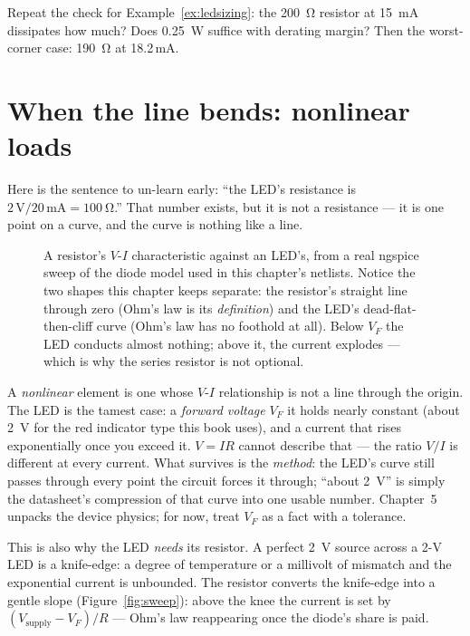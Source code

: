 \begin{exercise}[medium]
Repeat the check for Example~\ref{ex:ledsizing}: the \qty{200}{\ohm} resistor
at \qty{15}{\milli\ampere} dissipates how much? Does \qty{0.25}{\watt} suffice
with derating margin? Then the worst-corner case: \qty{190}{\ohm} at
18.2\,mA.
\end{exercise}

\section{When the line bends: nonlinear loads}
\label{sec:nonlinear}

Here is the sentence to un-learn early: ``the LED's resistance is
$2\,\mathrm{V}/20\,\mathrm{mA} = \qty{100}{\ohm}$.'' That number exists, but
it is not a resistance — it is one point on a curve, and the curve is nothing
like a line.

\begin{figure}[htbp]
\centering

\caption{A resistor's $V$-$I$ characteristic against an LED's, from a real
ngspice sweep of the diode model used in this chapter's netlists. Notice the
two shapes this chapter keeps separate: the resistor's straight line through
zero (Ohm's law is its \emph{definition}) and the LED's dead-flat-then-cliff
curve (Ohm's law has no foothold at all). Below $V_F$ the LED conducts almost
nothing; above it, the current explodes — which is why the series resistor is
not optional.}
\label{fig:vi}
\end{figure}

A \emph{nonlinear} element is one whose $V$-$I$
relationship is not a line through the origin. The LED is the tamest case:
a \emph{forward voltage} $V_F$ it holds nearly
constant (about \qty{2}{\volt} for the red indicator type this book uses),
and a current that rises exponentially once you exceed it. $V=IR$ cannot
describe that — the ratio $V/I$ is different at every current. What survives
is the \emph{method}: the LED's curve still passes through every point the
circuit forces it through; ``about \qty{2}{\volt}'' is simply the datasheet's
compression of that curve into one usable number. Chapter~5 unpacks the
device physics; for now, treat $V_F$ as a fact with a tolerance.

\begin{remark}
This is also why the LED \emph{needs} its resistor. A perfect \qty{2}{\volt}
source across a 2-V LED is a knife-edge: a degree of temperature or a
millivolt of mismatch and the exponential current is unbounded. The resistor
converts the knife-edge into a gentle slope (Figure~\ref{fig:sweep}): above
the knee the current is set by $(V_{\mathrm{supply}}-V_F)/R$ — Ohm's law
reappearing once the diode's share is paid.
\end{remark}

